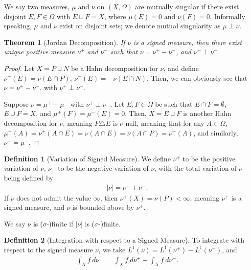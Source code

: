 \documentclass[12pt]{extarticle}
\theoremstyle{plain}
\newtheorem*{theorem}{Theorem}
\theoremstyle{definition}
\newtheorem*{definition}{Definition}
\theoremstyle{note}
\renewcommand{\newline}{\hfill\break}
\begin{document}
We say two measures, $\mu$ and $\nu$ on $(X,\Omega)$ are mutually singular if there exist disjoint $E,F\in \Omega$ with $E\sqcup F = X$, where $\mu(E) = 0$ and $\nu(F) = 0$. Informally speaking, $\mu$ and $\nu$ exist on disjoint sets; we denote mutual singularity as $\mu \perp \nu$.
\begin{theorem}[Jordan Decomposition]
  If $\nu$ is a signed measure, then there exist unique positive measure $\nu^{+}$ and $\nu^{-}$ such that $\nu = \nu^{+}-\nu^{-}$, and $\nu^{+}\perp \nu^{-}$.
\end{theorem}
\begin{proof}
  Let $X = P\sqcup N$ be a Hahn decomposition for $\nu$, and define $\nu^{+}\left(E\right) = \nu\left(E\cap P\right)$, $\nu^{-}\left(E\right)= -\nu\left(E\cap N\right)$. Then, we can obviously see that $\nu = \nu^{+} - \nu^{-}$, with $\nu^{+}\perp \nu^{-}$.\newline

  Suppose $\nu = \mu^{+} - \mu^{-}$ with $\nu^{+} \perp \nu^{-}$. Let $E,F\in \Omega$ be such that $E\cap F = \emptyset$, $E\cup F = X$, and $\mu^{+}\left(F\right) = \mu^{-}\left(E\right) = 0$. Then, $X = E \sqcup F$ is another Hahn decomposition for $\nu$, meaning $P\triangle E$ is $\nu$-null, meaning that for any $A\in \Omega$, $\mu^{+}\left(A\right) = \nu^{+}\left(A\cap E\right) = \nu\left(A\cap E\right) = \nu\left(A\cap P\right) = \nu^{+}\left(A\right)$, and similarly, $\nu^{-} = \mu^{-}$.
\end{proof}
\begin{definition}[Variation of Signed Measure]
  We define $\nu^{+}$ to be the positive variation of $\nu$, $\nu^{-}$ to be the negative variation of $\nu$, with the total variation of $\nu$ being defined by
  \begin{align*}
    |\nu| = \nu^{+} + \nu^{-}.
  \end{align*}
  If $\nu$ does not admit the value $\infty$, then $\nu^{+}(X) = \nu(P) < \infty$, meaning $\nu^{+}$ is a signed measure, and $\nu$ is bounded above by $\nu^{+}$.\newline

We say $\nu$ is ($\sigma$-)finite if $|\nu|$ is ($\sigma$-)finite.
\end{definition}
\begin{definition}[Integration with respect to a Signed Measure]
  To integrate with respect to the signed measure $\nu$, we take $L^{1}\left(\nu\right) = L^{1}\left(\nu^{+}\right) - L^{1}\left(\nu^{-}\right)$, and
  \begin{align*}
    \int_{X}^{} f\:d\nu &= \int_{X}^{} f\:d\nu^{+} - \int_{X}^{} f\:d\nu^{-}.
  \end{align*}
\end{definition}
\end{document}
